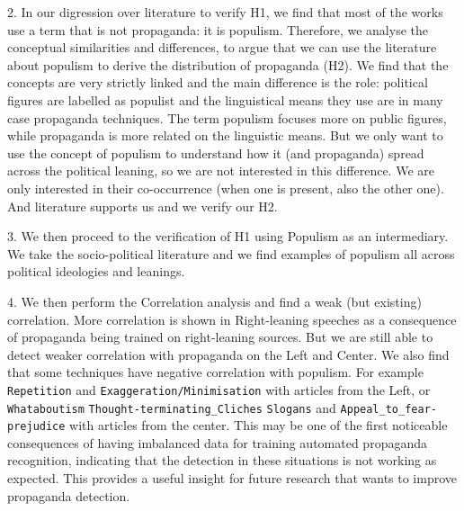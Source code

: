 2. In our digression over literature to verify H1, we find that most of the works use a term that is not propaganda: it is populism. Therefore, we analyse the conceptual similarities and differences, to argue that we can use the literature about populism to derive the distribution of propaganda (H2).
We find that the concepts are very strictly linked and the main difference is the role: political figures are labelled as populist and the linguistical means they use are in many case propaganda techniques. The term populism focuses more on public figures, while propaganda is more related on the linguistic means.
But we only want to use the concept of populism to understand how it (and propaganda) spread across the political leaning, so we are not interested in this difference. We are only interested in their co-occurrence (when one is present, also the other one). And literature supports us and we verify our H2.

3. We then proceed to the verification of H1 using Populism as an intermediary. We take the socio-political literature and we find examples of populism all across political ideologies and leanings.


4. We then perform the Correlation analysis and find a weak (but existing) correlation.
More correlation is shown in Right-leaning speeches as a consequence of propaganda being trained on right-leaning sources. But we are still able to detect weaker correlation with propaganda on the Left and Center.
We also find that some techniques have negative correlation with populism. For example \texttt{Repetition} and \texttt{Exaggeration/Minimisation} with articles from the Left, or \texttt{Whataboutism} \texttt{Thought-terminating\_Cliches} \texttt{Slogans} and \texttt{Appeal\_to\_fear-prejudice} with articles from the center.
This may be one of the first noticeable consequences of having imbalanced data for training automated propaganda recognition, indicating that the detection in these situations is not working as expected.
This provides a useful insight for future research that wants to improve propaganda detection.


